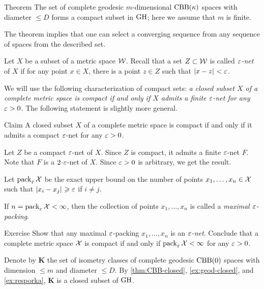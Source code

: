 \begin{thm}{Theorem}\label{thm:gromov-compactness}
The set of complete geodesic $m$-dimensional $\mathrm{CBB}(\kappa)$ spaces with diameter $\le D$ forms a compact subset in $\operatorname{\rm GH}\nolimits$;
here we assume that $m$ is finite.
\end{thm}

The theorem implies that one can select a converging sequence 
from any sequence of spaces from the described set.


Let $X$ be a subset of a metric space $\mathcal{W}$.
Recall that a set $Z\subset \mathcal{W}$ is called \emph{$\varepsilon$-net} of $X$ if for any point $x\in X$, there is a point $z\in Z$ such that $\dist{x}{z}{}<\eps$.

We will use the following characterization of compact sets: \textit{a closed subset $X$ of a complete metric space is compact if and only if $X$ admits a finite $\varepsilon$-net for any $\varepsilon>0$}.
The following statement is slightly more general.

\begin{thm}{Claim}\label{clm:compact-net}
A closed subset $X$ of a complete metric space is compact if and only if it admits a compact $\varepsilon$-net for any $\varepsilon>0$.
\end{thm}

Let $Z$ be a compact $\varepsilon$-net of $X$.
Since $Z$ is compact, it admits a finite $\varepsilon$-net $F$.
Note that $F$ is a $2\cdot\eps$-net of $X$.
Since $\varepsilon>0$ is arbitrary, we get the result.
\qeds

Let $\operatorname{\rm pack}\nolimits_\varepsilon\mathcal{X}$ be the exact upper bound on the number of points $x_1,\z\dots,x_n\in \spc{X}$ such that $\dist{x_i}{x_j}{}\ge\eps$ if $i\ne j$.

If $n=\operatorname{\rm pack}\nolimits_\varepsilon\mathcal{X}<\infty$, then
the collection of points $x_1,\dots,x_n$ is called a \emph{maximal $\varepsilon$-packing}.

\begin{thm}{Exercise}\label{ex:pack-net}
Show that any maximal $\varepsilon$-packing $x_1,\dots,x_n$ is an \emph{$\varepsilon$-net}.
Conclude that a complete metric space $\mathcal{X}$ is compact if and only if $\pack_\eps\spc{X}\z<\infty$ for any $\varepsilon>0$.
\end{thm}


Denote by $\bm{K}$ the set of isometry classes of  complete geodesic $\mathrm{CBB}(0)$ spaces  with dimension $\le m$ and diameter $\le D$.
By \ref{thm:CBB-closed}, \ref{ex:geod-closed}, and \ref{ex:resporka}, $\bm{K}$ is a closed subset of $\operatorname{\rm GH}\nolimits$.


